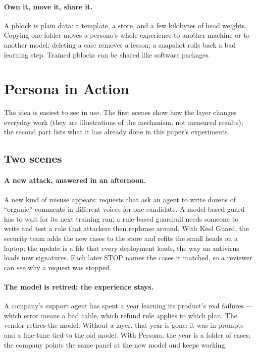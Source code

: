 \documentclass[11pt]{article}
\begin{document}
\paragraph{Own it, move it, share it.} A pblock is plain data: a template, a store, and a few kilobytes of head weights. Copying one folder moves a persona's whole experience to another machine or to another model; deleting a case removes a lesson; a snapshot rolls back a bad learning step. Trained pblocks can be shared like software packages.

\section{Persona in Action}
\label{sec:action}

The idea is easiest to see in use. The first scenes show how the layer changes everyday work (they are illustrations of the mechanism, not measured results); the second part lists what it has already done in this paper's experiments.

\subsection{Two scenes}

\paragraph{A new attack, answered in an afternoon.} A new kind of misuse appears: requests that ask an agent to write dozens of ``organic'' comments in different voices for one candidate. A model-based guard has to wait for its next training run; a rule-based guardrail needs someone to write and test a rule that attackers then rephrase around. With Keel Guard, the security team adds the new cases to the store and refits the small heads on a laptop; the update is a file that every deployment loads, the way an antivirus loads new signatures. Each later STOP names the cases it matched, so a reviewer can see why a request was stopped.

\paragraph{The model is retired; the experience stays.} A company's support agent has spent a year learning its product's real failures --- which error means a bad cable, which refund rule applies to which plan. The vendor retires the model. Without a layer, that year is gone: it was in prompts and a fine-tune tied to the old model. With Persona, the year is a folder of cases; the company points the same panel at the new model and keeps working.
\end{document}
